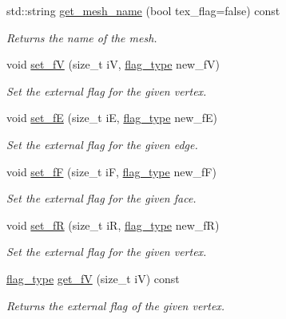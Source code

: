 \begin{DoxyCompactItemize}
std\+::string \hyperlink{classStemMesh3D_1_1mesh__3Dv_a64769d0a6781ff75ea2a1e603886d80a}{get\+\_\+mesh\+\_\+name} (bool tex\+\_\+flag=false) const
\begin{DoxyCompactList}\small\item\em Returns the name of the mesh. \end{DoxyCompactList}\item 
void \hyperlink{classStemMesh3D_1_1mesh__3Dv_a4bc6f51b9675c7dca59ab8ccfc256a44}{set\+\_\+fV} (size\+\_\+t iV, \hyperlink{classStemMesh3D_1_1mesh__3Dv_a9544cba555b60f17f04fcd1689314338}{flag\+\_\+type} new\+\_\+fV)
\begin{DoxyCompactList}\small\item\em Set the external flag for the given vertex. \end{DoxyCompactList}\item 
void \hyperlink{classStemMesh3D_1_1mesh__3Dv_a6b4fa28dbbe68fc44b75e3cdb4ffe7a2}{set\+\_\+fE} (size\+\_\+t iE, \hyperlink{classStemMesh3D_1_1mesh__3Dv_a9544cba555b60f17f04fcd1689314338}{flag\+\_\+type} new\+\_\+fE)
\begin{DoxyCompactList}\small\item\em Set the external flag for the given edge. \end{DoxyCompactList}\item 
void \hyperlink{classStemMesh3D_1_1mesh__3Dv_aa5c3c8d360f8107e370c935222c6849d}{set\+\_\+fF} (size\+\_\+t iF, \hyperlink{classStemMesh3D_1_1mesh__3Dv_a9544cba555b60f17f04fcd1689314338}{flag\+\_\+type} new\+\_\+fF)
\begin{DoxyCompactList}\small\item\em Set the external flag for the given face. \end{DoxyCompactList}\item 
void \hyperlink{classStemMesh3D_1_1mesh__3Dv_a0ac5f5f5f81fa2afcbe8a36990d9df21}{set\+\_\+fR} (size\+\_\+t iR, \hyperlink{classStemMesh3D_1_1mesh__3Dv_a9544cba555b60f17f04fcd1689314338}{flag\+\_\+type} new\+\_\+fR)
\begin{DoxyCompactList}\small\item\em Set the external flag for the given vertex. \end{DoxyCompactList}\item 
\hyperlink{classStemMesh3D_1_1mesh__3Dv_a9544cba555b60f17f04fcd1689314338}{flag\+\_\+type} \hyperlink{classStemMesh3D_1_1mesh__3Dv_a6836854df501ef92c61508ffe72cba53}{get\+\_\+fV} (size\+\_\+t iV) const
\begin{DoxyCompactList}\small\item\em Returns the external flag of the given vertex. \end{DoxyCompactList}\item 

\end{DoxyCompactItemize}
